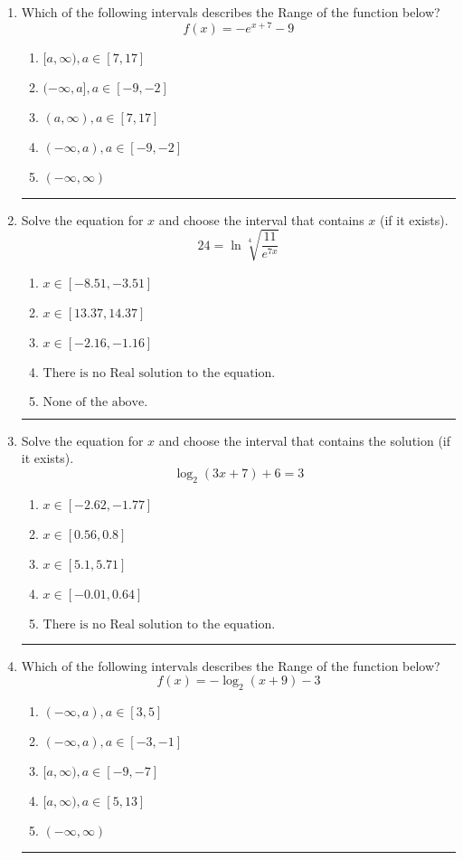 \documentclass[14pt]{extbook}
\newcommand{\litem}[1]{\item#1\hspace*{-1cm}\rule{\textwidth}{0.4pt}}
\begin{document}
\begin{enumerate}
{\begin{enumerate}[label=\Alph*.]
\end{enumerate} }
\litem{
Which of the following intervals describes the Range of the function below?\[ f(x) = -e^{x+7}-9 \]\begin{enumerate}[label=\Alph*.]
\item \( [a, \infty), a \in [7, 17] \)
\item \( (-\infty, a], a \in [-9, -2] \)
\item \( (a, \infty), a \in [7, 17] \)
\item \( (-\infty, a), a \in [-9, -2] \)
\item \( (-\infty, \infty) \)

\end{enumerate} }
\litem{
 Solve the equation for $x$ and choose the interval that contains $x$ (if it exists).\[  24 = \ln{\sqrt[4]{\frac{11}{e^{7x}}}} \]\begin{enumerate}[label=\Alph*.]
\item \( x \in [-8.51, -3.51] \)
\item \( x \in [13.37, 14.37] \)
\item \( x \in [-2.16, -1.16] \)
\item \( \text{There is no Real solution to the equation.} \)
\item \( \text{None of the above.} \)

\end{enumerate} }
\litem{
Solve the equation for $x$ and choose the interval that contains the solution (if it exists).\[ \log_{2}{(3x+7)}+6 = 3 \]\begin{enumerate}[label=\Alph*.]
\item \( x \in [-2.62, -1.77] \)
\item \( x \in [0.56, 0.8] \)
\item \( x \in [5.1, 5.71] \)
\item \( x \in [-0.01, 0.64] \)
\item \( \text{There is no Real solution to the equation.} \)

\end{enumerate} }
\litem{
Which of the following intervals describes the Range of the function below?\[ f(x) = -\log_2{(x+9)}-3 \]\begin{enumerate}[label=\Alph*.]
\item \( (-\infty, a), a \in [3, 5] \)
\item \( (-\infty, a), a \in [-3, -1] \)
\item \( [a, \infty), a \in [-9, -7] \)
\item \( [a, \infty), a \in [5, 13] \)
\item \( (-\infty, \infty) \)


\end{enumerate}}
\end{enumerate}
\end{document}
